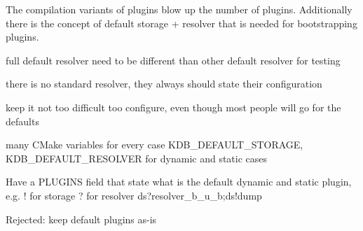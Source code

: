 The compilation variants of plugins blow up the number of plugins. Additionally there is the concept of default storage + resolver that is needed for bootstrapping plugins.


\begin{DoxyItemize}
\item full default resolver need to be different than other default resolver for testing
\item there is no standard resolver, they always should state their configuration
\end{DoxyItemize}


\begin{DoxyItemize}
\item keep it not too difficult too configure, even though most people will go for the defaults
\end{DoxyItemize}


\begin{DoxyItemize}
\item many C\+Make variables for every case K\+D\+B\+\_\+\+D\+E\+F\+A\+U\+L\+T\+\_\+\+S\+T\+O\+R\+A\+GE, K\+D\+B\+\_\+\+D\+E\+F\+A\+U\+L\+T\+\_\+\+R\+E\+S\+O\+L\+V\+ER for dynamic and static cases
\item Have a P\+L\+U\+G\+I\+NS field that state what is the default dynamic and static plugin, e.\+g. ! for storage ? for resolver ds?resolver\+\_\+b\+\_\+u\+\_\+b;ds!dump
\end{DoxyItemize}

Rejected\+: keep default plugins as-\/is
